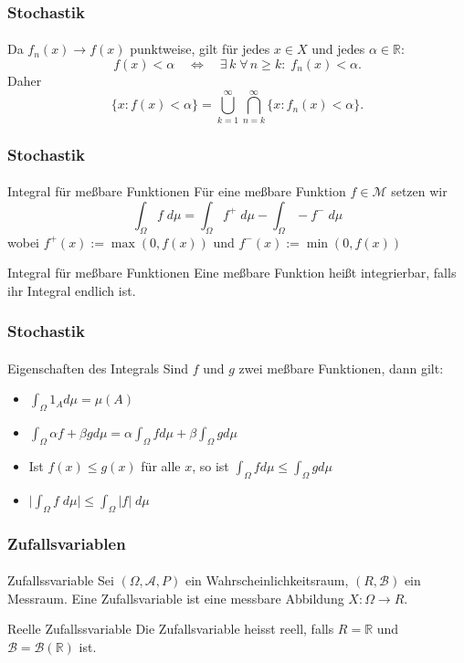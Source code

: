 \documentclass{beamer}
\begin{document}
    \begin{frame}
        \frametitle{Stochastik}
    \framesubtitle{}
       Da $f_n(x)\to f(x)$ punktweise, gilt für jedes $x\in X$ und jedes $\alpha\in\mathbb{R}$:
      \[
        f(x)<\alpha
        \quad\Longleftrightarrow\quad
        \exists\,k\;\forall\,n\ge k:\;f_n(x)<\alpha.
      \]
    Daher
    \[
      \{x:f(x)<\alpha\}
      = \bigcup_{k=1}^{\infty}\bigcap_{n=k}^{\infty}\{x:f_n(x)<\alpha\}.
    \]

\end{frame}
 



\begin{frame}
    \frametitle{Stochastik}
\framesubtitle{}
    \begin{block}{Integral für meßbare Funktionen}
        Für eine meßbare Funktion  $f \in \mathcal{M}$ setzen wir
        $$ \int_{\Omega} f \; d\mu = \int_{\Omega}f^+ \; d\mu  - \int_{\Omega}-f^- \; d\mu$$
        wobei $f^+(x) := \max (0, f(x))$ und $f^-(x) := \min (0, f(x))$
    \end{block}

    \begin{block}{Integral für meßbare Funktionen}
       Eine meßbare Funktion heißt integrierbar, falls ihr Integral endlich ist.
    \end{block}

\end{frame}

\begin{frame}
    \frametitle{Stochastik}
\framesubtitle{}
\begin{block}{Eigenschaften des Integrals}
    Sind $f$ und $g$ zwei meßbare Funktionen, dann gilt:
    \begin{itemize}
        \item $\int_{\Omega} 1_A  d\mu  = \mu (A)$  
    \item $\int_{\Omega} \alpha f  + \beta g d\mu = \alpha \int_{\Omega}  f d\mu + \beta  \int_{\Omega}  g d\mu$
    \item Ist $f(x) \leq g(x)$ für alle $x$, so ist $\int_{\Omega} f d\mu \leq \int_{\Omega} g d\mu$ 
    \item $ \biggl | \int_{\Omega} f \; d\mu \biggr | \leq \int_{\Omega} |f| \; d\mu $
    \end{itemize}
    \end{block}
\end{frame}




\begin{frame}
    \frametitle{Zufallsvariablen}
\framesubtitle{}
\begin{block}{Zufallssvariable}
    Sei $(\Omega, \mathcal{A}, P)$ ein Wahrscheinlichkeitsraum, $(R, \mathcal{B})$ ein Messraum.
    Eine  Zufallsvariable ist eine messbare Abbildung  $X :  \Omega \to R$.
\end{block}
\begin{block}{Reelle Zufallssvariable}
    Die Zufallsvariable heisst reell, falls $R = \mathbb{R}$ und $\mathcal{B} = \mathcal{B}(\mathbb{R})$ ist.
\end{block} 
\end{frame}
\end{document}
